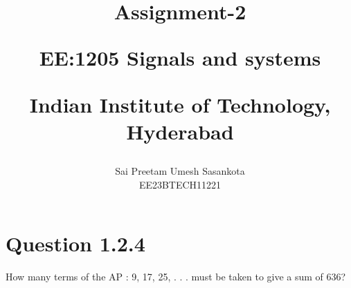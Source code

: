 \documentclass[journal,12pt,twocolumn]{IEEEtran}
\theoremstyle{remark}
\begin{document}
%




\vspace{3cm}

\title{
Assignment-2

\large{EE:1205 Signals and systems}

Indian Institute of Technology, Hyderabad
}
\author{Sai Preetam Umesh Sasankota

EE23BTECH11221
}	



\maketitle

\newpage


\bigskip

\renewcommand{\thefigure}{\theenumi}
\renewcommand{\thetable}{\theenumi}
	
\section{Question 1.2.4}
How many terms of the AP : 9, 17, 25, . . . must be taken to give a sum of 636?
\end{document}
